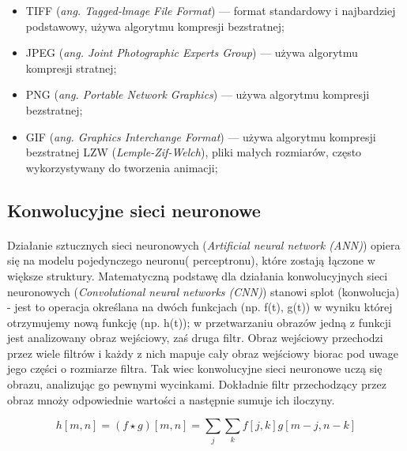 \documentclass[a4paper,12pt]{article}
\begin{document}
        \begin{spacing}{1}
            \begin{itemize}
	            \item TIFF (\textit{ang. Tagged-lmage File Format}) --- format standardowy i najbardziej podstawowy, używa algorytmu kompresji bezstratnej;
	            \item 	JPEG (\textit{ang. Joint Photographic Experts Group}) --- używa algorytmu kompresji stratnej;
	            \item PNG (\textit{ang. Portable Network Graphics}) --- używa algorytmu kompresji bezstratnej; 
                \item  GIF (\textit{ang. Graphics Interchange Format}) --- używa algorytmu kompresji bezstratnej LZW (\textit{Lemple-Zif-Welch}), pliki małych rozmiarów, często wykorzystywany do tworzenia animacji;
	        \end{itemize}
	    \end{spacing}
    
    
    \subsection{Konwolucyjne sieci neuronowe}
        \paragraph{\indent} Działanie sztucznych sieci neuronowych                        (\textit{Artificial neural network (ANN)}) opiera się na modelu pojedynczego     neuronu( perceptronu), które zostają łączone w większe struktury.
            Matematyczną podstawę dla działania konwolucyjnych sieci neuronowych (\textit{Convolutional neural networks (CNN)}) stanowi splot (konwolucja) - 
            jest to operacja określana na dwóch funkcjach (np. f(t), g(t)) w wyniku której otrzymujemy nową funkcję (np. h(t)); 
            w przetwarzaniu obrazów jedną z funkcji jest analizowany obraz wejściowy,
            zaś druga filtr.
            Obraz wejściowy przechodzi przez wiele filtrów i każdy z nich mapuje cały obraz wejściowy biorac pod uwage jego części o rozmiarze filtra. Tak wiec konwolucyjne sieci neuronowe uczą się obrazu, analizując go pewnymi wycinkami. Dokładnie filtr przechodzący przez obraz mnoży odpowiednie wartości a następnie sumuje ich iloczyny.
        
            \begin{displaymath}
                h[m, n] = ( f \star g)[m, n] = \sum\limits_{j}\sum\limits_{k}f[j, k]g[m-j, n-k]
            \end{displaymath}
		    
\end{document}
